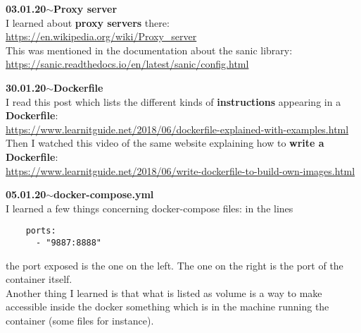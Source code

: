 \documentclass[11pt,a4paper]{article}
\newenvironment{loggentry}[2]%
{\noindent\textbf{#1}\hspace{1cm}$\mathbf{\sim}$\text{ }\textbf{#2}\\}{\vspace{0.5cm}}
\begin{document}
\begin{loggentry}{03.01.20}{Proxy server}

I learned about \textbf{proxy servers} there:\\
\url{https://en.wikipedia.org/wiki/Proxy_server}\\
This was mentioned in the documentation about the sanic library:\\
\url{https://sanic.readthedocs.io/en/latest/sanic/config.html}

\end{loggentry}


\begin{loggentry}{30.01.20}{Dockerfile}

I read this post which lists the different kinds of \textbf{instructions} appearing in a \textbf{Dockerfile}:\\
\url{https://www.learnitguide.net/2018/06/dockerfile-explained-with-examples.html}\\
Then I watched this video of the same website explaining how to \textbf{write a Dockerfile}:\\
\url{https://www.learnitguide.net/2018/06/write-dockerfile-to-build-own-images.html}

\end{loggentry}


\begin{loggentry}{05.01.20}{docker-compose.yml}

I learned a few things concerning docker-compose files:
in the lines
\begin{verbatim}
    ports:
      - "9887:8888"
\end{verbatim}
the port exposed is the one on the left. The one on the right is the port of the container itself.\\

Another thing I learned is that what is listed as volume is a way to make accessible inside the docker something which is in the machine running the container (some files for instance).

\end{loggentry}
\end{document}
